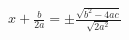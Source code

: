 \documentclass[preview]{standalone}
\begin{document}
\begin{align*}
x + \frac{b}{2 a} = \pm \frac{\sqrt{{b}^{2} - 4 a c}}{\sqrt{2 {a}^{2}}}
\end{align*}
\end{document}
